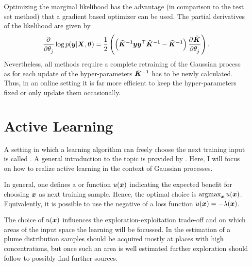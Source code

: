 Optimizing the marginal likelihood has the advantage (in comparison to the test 
set method) that a gradient based optimizer can be used. The partial derivatives 
of the likelihood are given by
\begin{equation}
    \dpd{}{\theta_j} \log p(\vc y | \mat X, \vc\theta) = \frac{1}{2} 
    \del{\del{\tilde{\mat K}^{-1}\vc y \vc y\Tr \tilde{\mat K}^{-1} 
            - \tilde{\mat{K}}^{-1}} \dpd{\tilde{\mat K}}{\theta_j}} \text{.}
\end{equation}
Nevertheless, all methods require a complete retraining of the Gaussian process 
as for each update of the hyper-parameters $\tilde{\bm{K}}^{-1}$ has to be newly 
calculated.  Thus, in an online setting it is far more efficient to keep the 
hyper-parameters fixed or only update them occasionally.

\section{Active Learning}\label{sec:utility}
A setting in which a learning algorithm can freely choose the next training 
input is called . A general introduction to the topic 
is provided by \textcite{Settles:2009vo}. Here, I will focus on how to realize 
active learning in the context of Gaussian processes.

In general, one defines a  or  function 
$u(\bm{x})$ indicating the expected benefit for choosing $\bm{x}$ as next training 
sample. Hence, the optimal choice is $\operatorname*{argmax}_{\bm{x}} u(\bm{x})$. Equivalently, 
it is possible to use the negative of a loss function $u(\bm{x}) = - \lambda(\bm{x})$.

The choice of $u(\bm{x})$ influences the exploration-exploitation trade-off and 
on which areas of the input space the learning will be focussed. In the 
estimation of a plume distribution samples should be acquired mostly at places 
with high concentrations, but once such an area is well estimated further 
exploration should follow to possibly find further sources.


